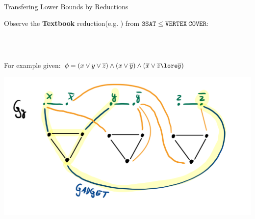 \begin{frame}[c]{Transfering Lower Bounds by Reductions}

Observe the \textbf{Textbook} reduction(e.g. \cite{redvc}) from $\mathtt{3SAT} \leq \mathtt{VERTEX~COVER}$:

\\~

For example given: $ \phi = (x \lor y \lor \overline{z}) \land (x \lor \overline{y}) \land (\overline{x} \lor \overline{z} \lore \overline{y})$
    \begin{center}
        \includegraphics[scale=0.12]{img/reduce-to-VC.png}
    \end{center}
    
\end{frame}

